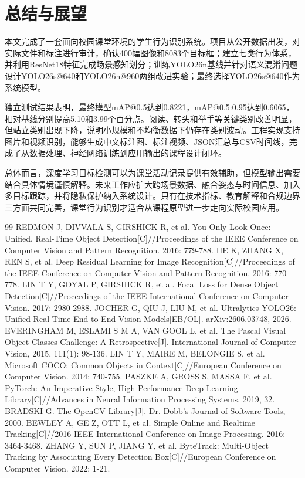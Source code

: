 \documentclass[12pt,hyperref,a4paper,UTF8]{ctexart}
\begin{document}
\section{总结与展望}
本文完成了一套面向校园课堂环境的学生行为识别系统。项目从公开数据出发，对实际文件和标注进行审计，确认400幅图像和8083个目标框；建立七类行为体系，并利用ResNet18特征完成场景感知划分；训练YOLO26n基线并针对语义混淆问题设计YOLO26s@640和YOLO26n@960两组改进实验；最终选择YOLO26s@640作为系统模型。\par
独立测试结果表明，最终模型mAP@0.5达到0.8221，mAP@0.5:0.95达到0.6065，相对基线分别提高5.10和3.99个百分点。阅读、转头和举手等关键类别改善明显，但站立类别出现下降，说明小规模和不均衡数据下仍存在类别波动。工程实现支持图片和视频识别，能够生成中文标注图、标注视频、JSON汇总与CSV时间线，完成了从数据处理、神经网络训练到应用输出的课程设计闭环。\par
总体而言，深度学习目标检测可以为课堂活动记录提供有效辅助，但模型输出需要结合具体情境谨慎解释。未来工作应扩大跨场景数据、融合姿态与时间信息、加入多目标跟踪，并将隐私保护纳入系统设计。只有在技术指标、教育解释和合规边界三方面共同完善，课堂行为识别才适合从课程原型进一步走向实际校园应用。\par
\clearpage
\begin{thebibliography}{99}
 REDMON J, DIVVALA S, GIRSHICK R, et al. You Only Look Once: Unified, Real-Time Object Detection[C]//Proceedings of the IEEE Conference on Computer Vision and Pattern Recognition. 2016: 779-788.
 HE K, ZHANG X, REN S, et al. Deep Residual Learning for Image Recognition[C]//Proceedings of the IEEE Conference on Computer Vision and Pattern Recognition. 2016: 770-778.
 LIN T Y, GOYAL P, GIRSHICK R, et al. Focal Loss for Dense Object Detection[C]//Proceedings of the IEEE International Conference on Computer Vision. 2017: 2980-2988.
 JOCHER G, QIU J, LIU M, et al. Ultralytics YOLO26: Unified Real-Time End-to-End Vision Models[EB/OL]. arXiv:2606.03748, 2026.
 EVERINGHAM M, ESLAMI S M A, VAN GOOL L, et al. The Pascal Visual Object Classes Challenge: A Retrospective[J]. International Journal of Computer Vision, 2015, 111(1): 98-136.
 LIN T Y, MAIRE M, BELONGIE S, et al. Microsoft COCO: Common Objects in Context[C]//European Conference on Computer Vision. 2014: 740-755.
 PASZKE A, GROSS S, MASSA F, et al. PyTorch: An Imperative Style, High-Performance Deep Learning Library[C]//Advances in Neural Information Processing Systems. 2019, 32.
 BRADSKI G. The OpenCV Library[J]. Dr. Dobb's Journal of Software Tools, 2000.
 BEWLEY A, GE Z, OTT L, et al. Simple Online and Realtime Tracking[C]//2016 IEEE International Conference on Image Processing. 2016: 3464-3468.
 ZHANG Y, SUN P, JIANG Y, et al. ByteTrack: Multi-Object Tracking by Associating Every Detection Box[C]//European Conference on Computer Vision. 2022: 1-21.
\end{thebibliography}
\appendix
\end{document}
